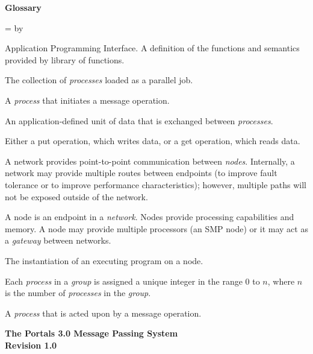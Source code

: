 \documentclass{sand-report}
\newcommand{\mydesclabel}[1]{\mbox{\textbf{#1}}\hfil}
\newenvironment{mydesc}%
{\begin{list}{}{%
      \renewcommand{\makelabel}{\mydesclabel}%
      \labelwidth=5\parindent%
      \leftmargin=\labelwidth%
      \advance \leftmargin by \labelsep%
      \setlength{\itemsep}{\smallskipamount}\setlength{\parsep}{0pt}}}%
  {\end{list}}
\begin{document}
\newpage

\tableofcontents

\listoffigures

\listoftables

\newpage

\vskip 1.5in
\begin{center}
{\large\bf Glossary}
\end{center}
\begin{mydesc}
\item[API] Application Programming Interface.  A definition of the
  functions and semantics provided by library of functions.
\item[Group] The collection of \emph{processes} loaded as a parallel
  job.
\item[Initiator] A \emph{process} that initiates a message operation.
\item[Message] An application-defined unit of data that is exchanged
  between \emph{processes}.
\item[Message Operation] Either a put operation, which writes data,
  or a get operation, which reads data.
\item[Network]  A network provides point-to-point communication
  between \emph{nodes}.   Internally, a network may provide multiple
  routes between endpoints (to improve fault tolerance or to improve
  performance characteristics); however, multiple paths will not be
  exposed outside of the network.
\item[Node]  A node is an endpoint in a \emph{network}.  Nodes
  provide processing capabilities and memory.  A node may provide
  multiple processors (an SMP node) or it may act as a \emph{gateway}
  between networks.
\item[Process] The instantiation of an executing program on a node.
\item[Rank] Each \emph{process} in a \emph{group} is assigned a unique 
  integer in the range 0 to $n$, where $n$ is the number of
  \emph{processes} in the \emph{group}.
\item[Target] A \emph{process} that is acted upon by a message
  operation.
\end{mydesc}

\newpage

\begin{center}
{\large\bf The Portals 3.0 Message Passing System \\ Revision 1.0}
\end{center}

\vskip 0.5in
\end{document}
